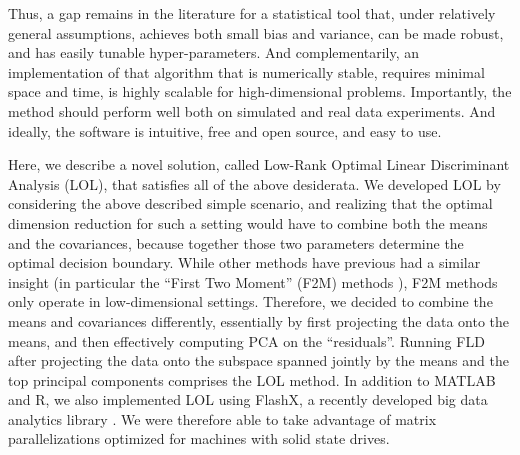 \documentclass[10pt]{article}
\begin{document}



Thus, a gap remains in the literature for a statistical tool that, under relatively general assumptions, achieves both small bias and variance, can be made robust, and has easily tunable hyper-parameters.  And complementarily, an implementation of that algorithm that is numerically stable, requires minimal space and time, is highly scalable for high-dimensional problems. Importantly, the method should perform well both on simulated and real data experiments.  And ideally, the software is intuitive, free and open source, and easy to use.

Here, we describe a novel solution, called Low-Rank Optimal Linear Discriminant Analysis (LOL), that satisfies all of the above desiderata. We developed LOL by considering the above described simple scenario, and realizing that the optimal dimension reduction for such a setting would have to combine both the means and the covariances, because together those two parameters determine the optimal decision boundary.  While other methods have previous had a similar insight (in particular the ``First Two Moment'' (F2M) methods \cite{Li1991a, Tishby1999a, Globerson2003a, Cook2005a,Fukumizu2004a}), F2M methods only operate in low-dimensional settings.  Therefore, we decided to combine the means and covariances differently, essentially by first projecting the data onto the means, and then effectively computing PCA on the ``residuals''.  Running FLD after projecting the data onto the subspace spanned jointly by the means and the top principal components comprises the LOL method.  In addition to MATLAB and R, we also implemented LOL using FlashX, a recently developed big data analytics library \cite{??}.  We were therefore able to take advantage of matrix parallelizations optimized for machines with solid state drives.
\end{document}
